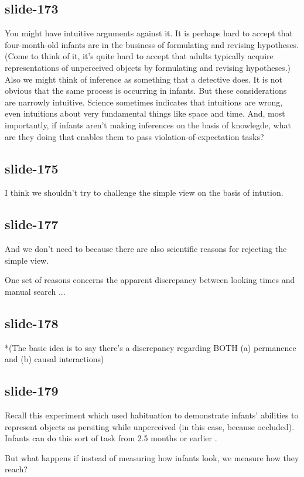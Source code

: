 \documentclass[12pt,\papersize]{extarticle}
\begin{document}
\subsection{slide-173}
You might have intuitive arguments against it.
It is perhaps hard to accept that four-month-old infants are in the business of formulating and revising hypotheses.
(Come to think of it, it’s quite hard to accept that adults typically acquire representations of unperceived objects by formulating and revising hypotheses.)
Also we might think of inference as something that a detective does.  It is not obvious that the same process is occurring in infants.
But these considerations are narrowly intuitive.
Science sometimes indicates that intuitions are wrong, even intuitions about very fundamental things like space and time.
And, most importantly, if infants aren’t making inferences on the basis of knowlegde, what are they doing that enables them to pass violation-of-expectation tasks?
 
\subsection{slide-175}
I think we shouldn't try to challenge the simple view on the basis of intution.
 
\subsection{slide-177}
And we don't need to because there are also scientific reasons for rejecting the simple view.
 
One set of reasons concerns the apparent discrepancy between looking times and manual search ...
 
\subsection{slide-178}
*(The basic idea is to say there's a discrepancy regarding BOTH (a) permanence and (b) 
causal interactions)
 
\subsection{slide-179}
Recall this experiment which used habituation to demonstrate infants' abilities to represent
objects as persiting while unperceived (in this case, because occluded).
Infants can do this sort of task from 2.5 months or earlier \citep{Aguiar:1999jq}.
 
But what happens if instead of measuring how infants look, we measure how they reach?
 
\end{document}
